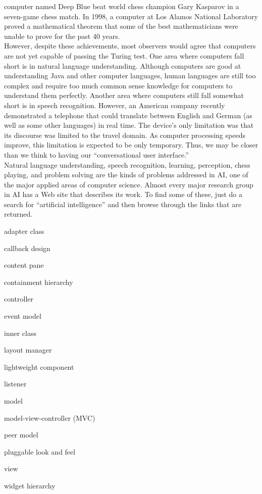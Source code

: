 computer named Deep Blue beat world chess champion
Gary Kasparov in a seven-game chess match. In 1998, a computer
at Los Alamos National Laboratory proved a mathematical theorem
that some of the best mathematicians were unable to prove
for the past 40 years.\\
\hspace*{1pc}However, despite these achievements, most observers would agree that
computers are not yet capable of passing the Turing test. One area
where computers fall short is in natural language
understanding. Although computers are good at understanding Java and
other computer languages, human languages are still too complex and
require too much common sense knowledge for computers to understand
them perfectly. Another area where computers still fall somewhat short
is in speech recognition. However, an American company recently
demonstrated a telephone that could translate between English and
German (as well as some other languages) in real time.  The device's
only limitation was that its discourse was limited to the travel
domain.  As computer processing speeds improve, this limitation is
expected to be only temporary.  Thus, we may be closer than we think
to having our ``conversational user interface.''\\
\hspace*{1pc}Natural language understanding, speech recognition, learning,
perception, chess playing, and problem solving are the kinds of
problems addressed in AI, one of the major applied areas of computer
science. Almost every major research group in AI has a Web site that
describes its work. To find some of these, just do a search for
``artificial intelligence'' and then browse through the links that
are returned.

\pagebreak
{}

\nopagebreak{}

\begin{KT}
adapter class

callback design

content pane

containment hierarchy

controller

event model

inner class

layout manager

lightweight  component

listener

model

model-view-controller (MVC)

peer model

pluggable look and feel

view

widget hierarchy

\end{KT}



